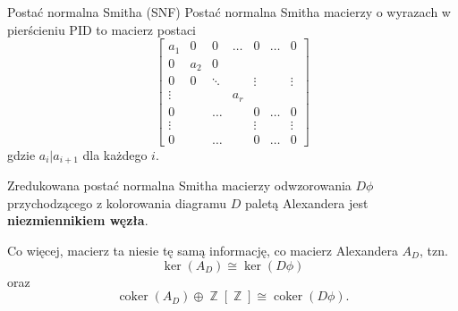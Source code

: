 \documentclass{beamer}
\DeclareMathOperator{\Z}{\mathbb{Z}}
\DeclareMathOperator{\coker}{coker}
\begin{document}

  \begin{frame}{Postać normalna Smitha (SNF)}
    Postać normalna Smitha macierzy o wyrazach w pierścieniu PID to macierz postaci
    $$
\begin{bmatrix}
  a_1 & 0 & 0 & \hdots & 0 & \hdots & 0 \\ 
  0 & a_2 & 0\\ 
  0 & 0 & \ddots & & \vdots & & \vdots\\ 
  \vdots & & & a_r\\ 
  0 & & \hdots & & 0 & \hdots & 0 \\ 
  \vdots & & & & \vdots & & \vdots\\ 
  0 & & \hdots & & 0 & \hdots & 0
\end{bmatrix}
$$
    gdzie $a_i|a_{i+1}$ dla każdego $i$.
  \end{frame}

  \begin{frame}{}
    Zredukowana postać normalna Smitha macierzy odwzorowania $D\phi$ przychodzącego z kolorowania diagramu $D$ paletą Alexandera jest \textbf{niezmiennikiem węzła}.

      Co więcej, macierz ta niesie tę samą informację, co macierz Alexandera $A_D$, tzn. 
    $$\ker(A_D)\cong \ker(D\phi)$$
    oraz 
    $$\coker(A_D)\oplus \Z[\Z]\cong\coker(D\phi).$$

  \end{frame}
\end{document}
